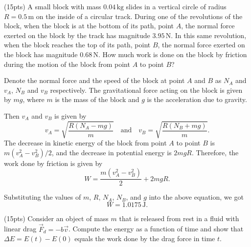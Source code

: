 \documentclass{article}
\begin{document}
\begin{problem}
	(15pts) A small block with mass $0.04\,\mathrm{kg}$ slides in a vertical circle of radius $R=0.5\,\mathrm{m}$ on the inside of a circular track. During one of the revolutions of the block, when the block is at the bottom of its path, point $A$, the normal force exerted on the block by the track has magnitude $3.95\,\mathrm{N}$. In this same revolution, when the block reaches the top of its path, point $B$, the normal force exerted on the block has magnitude $0.68\,\mathrm{N}$. How much work is done on the block by friction during the motion of the block from point $A$ to point $B$?
\end{problem}

\begin{solution}
	Denote the normal force and the speed of the block at point $A$ and \( B \) as $N_A$ and $v_A$, $N_B$ and $v_B$ respectively. The gravitational force acting on the block is given by $mg$, where $m$ is the mass of the block and $g$ is the acceleration due to gravity.\par
	Then \( v_A \) and \( v_B \) is given by
	\[ v_A=\sqrt{\frac{R(N_A-mg)}{m}} \quad \text{and} \quad v_B=\sqrt{\frac{R(N_B+mg)}{m}}. \] 
	The decrease in kinetic energy of the block from point \( A \) to point \( B \) is \( m(v_A^2-v_B^2)/2 \), and the decrease in potential energy is \( 2mgR \). Therefore, the work done by friction is given by
	\[ W = \frac{m(v_A^2-v_B^2)}{2} + 2mgR. \]\par
	Substituting the values of \( m \), \( R \), \( N_A \), \( N_B \), and \( g \) into the above equation, we got
	\[ W=1.0175\,\mathrm{J}. \] 
\end{solution}

\begin{problem}
	(15pts) Consider an object of mass $m$ that is released from rest in a fluid with linear drag $\vec{F}_d=-b\vec{v}$. Compute the energy as a function of time and show that $\Delta E=E(t)-E(0)$ equals the work done by the drag force in time $t$.
\end{problem}
\end{document}
